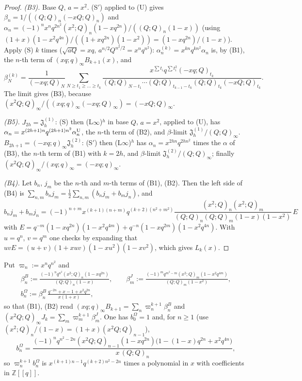 \documentclass[11pt]{amsart}
\theoremstyle{definition}
\numberwithin{equation}{section}
\newcommand{\Z}{\mathbb{Z}}
\begin{document}
\begin{proof}
\emph{(B3).} Base $Q$, $a=x^2$. (S$'$) applied to (U) gives $\beta_n=1/((Q;Q)_n(-xQ;Q)_n)$ and
$\alpha_n=(-1)^nx^nq^{2n^2}(x^2;Q)_n(1-xq^{2n})/((Q;Q)_n(1-x))$ (using
$(1+x)(1-x^2q^{4n})/((1+xq^{2n})(1-x^2))=(1-xq^{2n})/(1-x)$). Apply (S) $k$ times ($\sqrt{aQ}=xq$,
$a^{n/2}Q^{n^2/2}=x^nq^{n^2}$): $\alpha^{(k)}_n=x^{kn}q^{kn^2}\alpha_n$ is, by (B1), the $n$-th term of
$(xq;q)_\infty B_{k+1}(x)$, and
\[\beta^{(k)}_N=\frac1{(-xq;Q)_N}\sum_{N\ge t_1\ge\dots\ge t_k}\frac{x^{\sum t_i}q^{\sum t_i^2}(-xq;Q)_{t_k}}{(Q;Q)_{N-t_1}\cdots(Q;Q)_{t_{k-1}-t_k}(Q;Q)_{t_k}(-xQ;Q)_{t_k}}.\]
The limit gives (B3), because $(x^2Q;Q)_\infty/((xq;q)_\infty(-xq;Q)_\infty)=(-xQ;Q)_\infty$.

\emph{(B5).} $J_{2h}=\mathfrak J^{(1)}_h$: (S) then (L$\infty$)$^h$ in base $Q$, $a=x^2$, applied to (U),
has $\alpha_n=x^{(2h+1)n}q^{(2h+1)n^2}\alpha^{\rm U}_n$, the $n$-th term of (B2), and $\beta$-limit
$\mathfrak J^{(1)}_h/(Q;Q)_\infty$. $B_{2h+1}=(-xq;q)_\infty\mathfrak J^{(2)}_h$: (S$'$) then
(L$\infty$)$^h$ has $\alpha_n=x^{2hn}q^{2hn^2}$ times the $\alpha$ of (B3), the $n$-th term of (B1) with
$k=2h$, and $\beta$-limit $\mathfrak J^{(2)}_h/(Q;Q)_\infty$; finally
$(x^2Q;Q)_\infty/(xq;q)_\infty=(-xq;q)_\infty$.

\emph{(B4).} Let $b_n$, $j_m$ be the $n$-th and $m$-th terms of (B1), (B2). Then the left side of (B4) is
$\sum_{n,m}b_nj_m=\frac12\sum_{n,m}(b_nj_m+b_mj_n)$, and
\[b_nj_m+b_mj_n=(-1)^{n+m}x^{(k+1)(n+m)}q^{(k+2)(n^2+m^2)}\frac{(x^2;Q)_n(x^2;Q)_m}{(Q;Q)_n(Q;Q)_m(1-x)(1-x^2)}\,E\]
with $E=q^{-m}(1-xq^{2n})(1-x^2q^{4m})+q^{-n}(1-xq^{2m})(1-x^2q^{4n})$. With $u=q^n$, $v=q^m$ one checks by
expanding that $uvE=(u+v)(1+xuv)(1-xu^2)(1-xv^2)$, which gives $L_k(x)$.
\end{proof}

Put $\varpi_n:=x^nq^{n^2}$ and
\begin{equation}\label{eq:betas}
\begin{gathered}
\beta^B_n:=\frac{(-1)^nq^{n^2}(x^2;Q)_n(1-xq^{2n})}{(Q;Q)_n(1-x)},\qquad
\beta^J_m:=\frac{(-1)^mq^{m^2-m}(x^2;Q)_m(1-x^2q^{4m})}{(Q;Q)_m(1-x^2)},\\
b^\Omega_n:=\beta^B_n\,\frac{q^{-2n}+x-1+x^2q^{2n}}{x(1+x)},
\end{gathered}
\end{equation}
so that (B1), (B2) read $(xq;q)_\infty B_{k+1}=\sum_n\varpi_n^{k+1}\beta^B_n$ and
$(x^2Q;Q)_\infty J_k=\sum_m\varpi_m^{k+1}\beta^J_m$. One has $b^\Omega_0=1$ and, for $n\ge1$ (use
$(x^2;Q)_n/(1-x)=(1+x)(x^2Q;Q)_{n-1}$),
\begin{equation}\label{eq:bOmega}
b^\Omega_n=\frac{(-1)^nq^{n^2-2n}(x^2Q;Q)_{n-1}(1-xq^{2n})\bigl(1-(1-x)q^{2n}+x^2q^{4n}\bigr)}{x\,(Q;Q)_n},
\end{equation}
so $\varpi_n^{k+1}b^\Omega_n$ is $x^{(k+1)n-1}q^{(k+2)n^2-2n}$ times a polynomial in $x$ with coefficients in $\Z[[q]]$.
\end{document}
